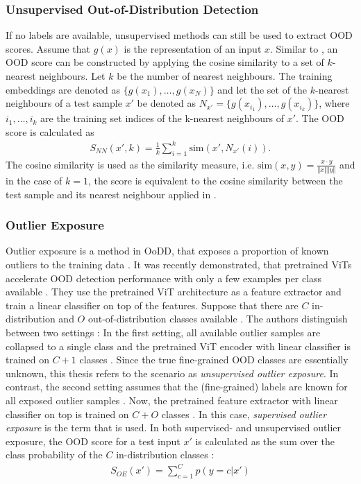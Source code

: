 \subsubsection{Unsupervised Out-of-Distribution Detection}
If no labels are available, unsupervised methods can still be used to extract OOD scores.
Assume that $g(x)$ is the representation of an input $x$.
Similar to \citep{Michels2023,Sun2022}, an OOD score can be constructed by applying the cosine similarity to a set of $k$-nearest neighbours.
Let $k$ be the number of nearest neighbours.
The training embeddings are denoted as $\{g(x_1),\dots,g(x_N)\}$ and let the set of the $k$-nearest neighbours of a test sample $x'$ be denoted as $N_{x'} = \{g(x_{i_1}),\dots,g(x_{i_k})\}$, where $i_1,\dots,i_k$ are the training set indices of the k-nearest neighbours of $x'$.
The OOD score is calculated as \citep{Michels2023,Sun2022}
\begin{align}
	S_{NN}(x',k) = \frac{1}{k}\sum_{i=1}^k \text{sim}(x',N_{x'}(i)).
	\label{equation:knn-score}
\end{align}
The cosine similarity is used as the similarity measure, i.e. $\text{sim}(x,y) = \frac{x\cdot y}{\Vert x \Vert \Vert y \Vert}$ and in the case of $k=1$, the score is equivalent to the cosine similarity between the test sample and its nearest neighbour applied in \citep{Michels2023}.
\subsubsection{Outlier Exposure}
Outlier exposure is a method in OoDD, that exposes a proportion of known outliers to the training data \citep{Hendrycks2018}.
It was recently demonstrated, that pretrained ViTs accelerate OOD detection performance with only a few examples per class available \citep{Fort2021}.
They use the pretrained ViT architecture as a feature extractor and train a linear classifier on top of the features.
Suppose that there are $C$ in-distribution and $O$ out-of-distribution classes available \citep{Fort2021}.
The authors distinguish between two settings \citep{Fort2021}:
In the first setting, all available outlier samples are collapsed to a single class and the pretrained ViT encoder with linear classifier is trained on $C+1$ classes \citep{Fort2021,Thulasidasan2021}.
Since the true fine-grained OOD classes are essentially unknown, this thesis refers to the scenario as \textit{unsupervised outlier exposure}.
In contrast, the second setting assumes that the (fine-grained) labels are known for all exposed outlier samples \citep{Fort2021,Roy2021}.
Now, the pretrained feature extractor with linear classifier on top is trained on $C+O$ classes \citep{Fort2021}.
In this case, \textit{supervised outlier exposure} is the term that is used.
In both supervised- and unsupervised outlier exposure, the OOD score for a test input $x'$ is calculated as the sum over the class probability of the $C$ in-distribution classes \citep{Fort2021}:
\begin{align}
	S_{OE}(x') = \sum_{c=1}^{C}p(y=c|x') 
\end{align}
